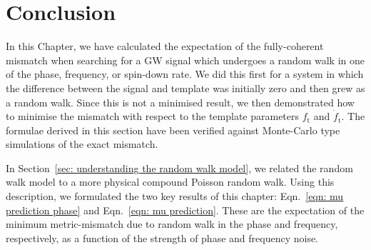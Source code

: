 \documentclass[../full_thesis/full_thesis.tex]{subfiles}
\newcommand{\thisdir}{../analytic_timing_noise_cgw}
\begin{document}
%


\section{Conclusion}

In this Chapter, we have calculated the expectation of the fully-coherent
mismatch when searching for a GW signal which undergoes a random walk in one of
the phase, frequency, or spin-down rate. We did this first for a system in
which the difference between the signal and template was initially zero and
then grew as a random walk. Since this is not a minimised result, we then
demonstrated how to minimise the mismatch with respect to the template
parameters $f_\textrm{t}$ and $\dot{f}_\textrm{t}$. The formulae derived in
this section have been verified against Monte-Carlo type simulations of the exact
mismatch.

In Section~\ref{sec: understanding the random walk model}, we related the
random walk model to a more physical compound Poisson random walk. Using this
description, we formulated the two key results of this chapter:
Eqn.~\eqref{eqn: mu prediction phase} and Eqn.~\eqref{eqn: mu prediction}.
These are the expectation of the minimum metric-mismatch due to random walk in
the phase and frequency, respectively, as a function of the strength of phase and
frequency noise.
\end{document}
